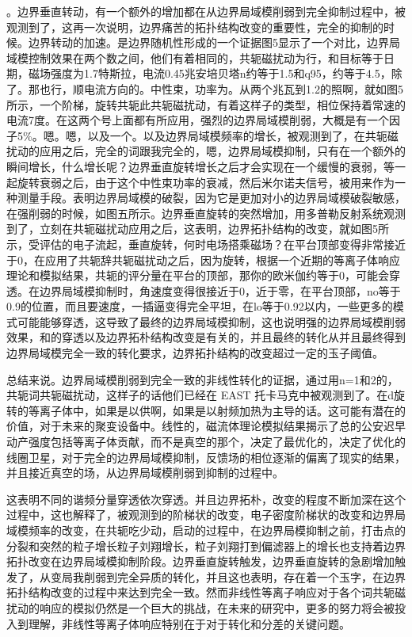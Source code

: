 。边界垂直转动，有一个额外的增加都在从边界局域模削弱到完全抑制过程中，被观测到了，这再一次说明，边界痛苦的拓扑结构改变的重要性，完全的抑制的时候。边界转动的加速。是边界随机性形成的一个证据图5显示了一个对比，边界局域模控制效果在两个数之间，他们有着相同的，共轭磁扰动为行，和目标等于日期，磁场强度为1.7特斯拉，电流0.45兆安培贝塔n约等于1.5和q95，约等于4.5，除了。那也行，顺电流方向的。中性束，功率为。从两个兆瓦到1.2的照啊，就如图5所示，一个阶梯，旋转共轭此共轭磁扰动，有着这样子的类型，相位保持着常速的电流7度。在这两个号上面都有所应用，强烈的边界局域模削弱，大概是有一个因子5\%。嗯。嗯，以及一个。以及边界局域模频率的增长，被观测到了，在共轭磁扰动的应用之后，完全的词跟我完全的，嗯，边界局域模抑制，只有在一个额外的瞬间增长，什么增长呢？边界垂直旋转增长之后才会实现在一个缓慢的衰弱，等一起旋转衰弱之后，由于这个中性束功率的衰减，然后米尔诺夫信号，被用来作为一种测量手段。表明边界局域模的破裂，因为它是更加对小的边界局域模破裂敏感，在强削弱的时候，如图五所示。边界垂直旋转的突然增加，用多普勒反射系统观测到了，立刻在共轭磁扰动应用之后，这表明，边界拓扑结构的改变，就如图5所示，受评估的电子流起，垂直旋转，何时电场搭乘磁场？在平台顶部变得非常接近于0，在应用了共轭辞共轭磁扰动之后，因为旋转，根据一个近期的等离子体响应理论和模拟结果，共轭的评分量在平台的顶部，那你的欧米伽约等于0，可能会穿透。在边界局域模抑制时，角速度变得很接近于0，近于零，在平台顶部，no等于0.9的位置，而且要速度，一插逼变得完全平坦，在lo等于0.92以内，一些更多的模式可能能够穿透，这导致了最终的边界局域模抑制，这也说明强的边界局域模削弱效果，和的穿透以及边界拓朴结构改变是有关的，并且最终的转化从并且最终得到边界局域模完全一致的转化要求，边界拓扑结构的改变超过一定的玉子阈值。

总结来说。边界局域模削弱到完全一致的非线性转化的证据，通过用n=1和2的，共轭词共轭磁扰动，这样子的话他们已经在  EAST  托卡马克中被观测到了。在d旋转的等离子体中，如果是以供啊，如果是以射频加热为主导的话。这可能有潜在的价值，对于未来的聚变设备中。线性的，磁流体理论模拟结果揭示了总的公安迟早动产强度包括等离子体贡献，而不是真空的那个，决定了最优化的，决定了优化的线圈卫星，对于完全的边界局域模抑制，反馈场的相位逐渐的偏离了现实的结果，并且接近真空的场，从边界局域模削弱到抑制的过程中。

这表明不同的谐频分量穿透依次穿透。并且边界拓朴，改变的程度不断加深在这个过程中，这也解释了，被观测到的阶梯状的改变，电子密度阶梯状的改变和边界局域模频率的改变，在共轭吃少动，启动的过程中，在边界局模抑制之前，打击点的分裂和突然的粒子增长粒子刘翔增长，粒子刘翔打到偏滤器上的增长也支持着边界拓扑改变在边界局域模抑制阶段。边界垂直旋转触发，边界垂直旋转的急剧增加触发了，从变局我削弱到完全异质的转化，并且这也表明，存在着一个玉字，在边界拓扑结构改变的过程中来达到完全一致。然而非线性等离子响应对于各个词共轭磁扰动的响应的模拟仍然是一个巨大的挑战，在未来的研究中，更多的努力将会被投入到理解，非线性等离子体响应特别在于对于转化和分差的关键问题。




